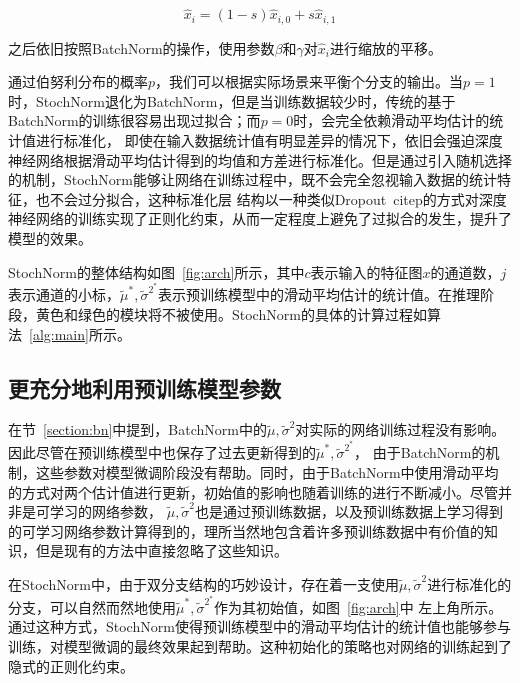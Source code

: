 \begin{equation}
  \widehat{x}_{i}=(1-s)\widehat{x}_{i,0}+s\widehat{x}_{i,1}
\end{equation}

之后依旧按照BatchNorm的操作，使用参数$\beta$和$\gamma$对$\widehat{x}_{i}$进行缩放的平移。

通过伯努利分布的概率$p$，我们可以根据实际场景来平衡个分支的输出。当$p=1$时，StochNorm退化为BatchNorm，但是当训练数据较少时，传统的基于BatchNorm的训练很容易出现过拟合；而$p=0$时，会完全依赖滑动平均估计的统计值进行标准化，
即使在输入数据统计值有明显差异的情况下，依旧会强迫深度神经网络根据滑动平均估计得到的均值和方差进行标准化。但是通过引入随机选择的机制，StochNorm能够让网络在训练过程中，既不会完全忽视输入数据的统计特征，也不会过分拟合，这种标准化层
结构以一种类似Dropout~citep{}的方式对深度神经网络的训练实现了正则化约束，从而一定程度上避免了过拟合的发生，提升了模型的效果。

StochNorm的整体结构如图~\ref{fig:arch}所示，其中$c$表示输入的特征图$x$的通道数，$j$表示通道的小标，$\tilde{\mu}^*, \tilde{\sigma}^{2^*}$表示预训练模型中的滑动平均估计的统计值。在推理阶段，黄色和绿色的模块将不被使用。StochNorm的具体的计算过程如算法~\ref{alg:main}所示。

\subsection{更充分地利用预训练模型参数}


在节~\ref{section:bn}中提到，BatchNorm中的$\tilde{\mu}, \tilde{\sigma}^2$对实际的网络训练过程没有影响。因此尽管在预训练模型中也保存了过去更新得到的$\tilde{\mu}^*, \tilde{\sigma}^{2^*}$，
由于BatchNorm的机制，这些参数对模型微调阶段没有帮助。同时，由于BatchNorm中使用滑动平均的方式对两个估计值进行更新，初始值的影响也随着训练的进行不断减小。尽管并非是可学习的网络参数，
$\tilde{\mu}, \tilde{\sigma}^2$也是通过预训练数据，以及预训练数据上学习得到的可学习网络参数计算得到的，理所当然地包含着许多预训练数据中有价值的知识，但是现有的方法中直接忽略了这些知识。

在StochNorm中，由于双分支结构的巧妙设计，存在着一支使用$\tilde{\mu}, \tilde{\sigma}^2$进行标准化的分支，可以自然而然地使用$\tilde{\mu}^*, \tilde{\sigma}^{2^*}$作为其初始值，如图~\ref{fig:arch}中
左上角所示。通过这种方式，StochNorm使得预训练模型中的滑动平均估计的统计值也能够参与训练，对模型微调的最终效果起到帮助。这种初始化的策略也对网络的训练起到了隐式的正则化约束。

